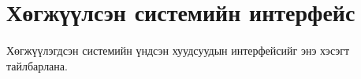 







\section{Хөгжүүлсэн системийн интерфейс}

\paragraph{} Хөгжүүлэгдсэн системийн үндсэн хуудсуудын интерфейсийг энэ хэсэгт тайлбарлана.

